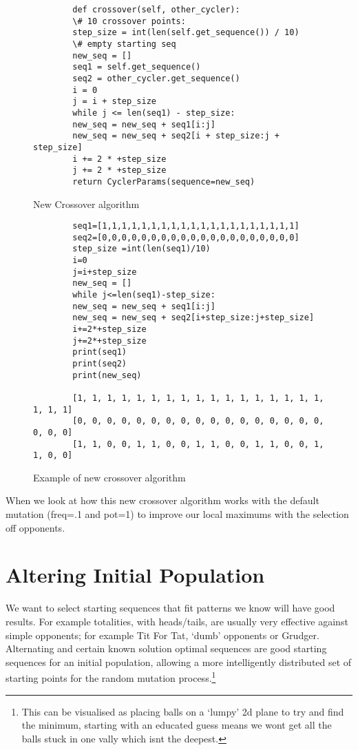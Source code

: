 \begin{figure}
    \begin{verbatim}
        def crossover(self, other_cycler):
        \# 10 crossover points:
        step_size = int(len(self.get_sequence()) / 10)
        \# empty starting seq
        new_seq = []
        seq1 = self.get_sequence()
        seq2 = other_cycler.get_sequence()
        i = 0
        j = i + step_size
        while j <= len(seq1) - step_size:
        new_seq = new_seq + seq1[i:j]
        new_seq = new_seq + seq2[i + step_size:j + step_size]
        i += 2 * +step_size
        j += 2 * +step_size
        return CyclerParams(sequence=new_seq)
    \end{verbatim}
    \caption{New Crossover algorithm}\label{fig:newCrossover}
\end{figure}

\begin{figure}
    \begin{verbatim}
        seq1=[1,1,1,1,1,1,1,1,1,1,1,1,1,1,1,1,1,1,1,1]
        seq2=[0,0,0,0,0,0,0,0,0,0,0,0,0,0,0,0,0,0,0,0]
        step_size =int(len(seq1)/10)
        i=0
        j=i+step_size
        new_seq = []
        while j<=len(seq1)-step_size:
        new_seq = new_seq + seq1[i:j]
        new_seq = new_seq + seq2[i+step_size:j+step_size]
        i+=2*+step_size
        j+=2*+step_size
        print(seq1)
        print(seq2)
        print(new_seq)

        [1, 1, 1, 1, 1, 1, 1, 1, 1, 1, 1, 1, 1, 1, 1, 1, 1, 1, 1, 1]
        [0, 0, 0, 0, 0, 0, 0, 0, 0, 0, 0, 0, 0, 0, 0, 0, 0, 0, 0, 0]
        [1, 1, 0, 0, 1, 1, 0, 0, 1, 1, 0, 0, 1, 1, 0, 0, 1, 1, 0, 0]
    \end{verbatim}
    \caption{Example of new crossover algorithm}\label{fig:newCrossoverEX}
\end{figure}

When we look at how this new crossover algorithm works with the default mutation (freq=.1 and pot=1) to improve our local maximums with the selection off opponents.\\


\section{Altering Initial Population}\label{subsec:alteringinitialpopulation}
We want to select starting sequences that fit patterns we know will have good results.
For example totalities, with heads/tails, are usually very effective against simple opponents;
for example Tit For Tat, `dumb' opponents or Grudger.
Alternating and certain known solution optimal sequences are good starting sequences for an initial population, allowing a more intelligently distributed set of starting points for the random mutation process.\footnote{This can be visualised as placing balls on a `lumpy' 2d plane to try and find the minimum, starting with an educated guess means we wont get all the balls stuck in one vally which isnt the deepest.}

